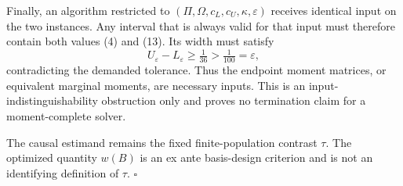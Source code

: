 Finally, an algorithm restricted to \((\Pi,\Omega,c_L,c_U,\kappa,\varepsilon)\) receives identical input on the two instances.  Any interval that is always valid for that input must therefore contain both values (4) and (13).  Its width must satisfy
\[
U_\varepsilon-L_\varepsilon\ge\tfrac1{36}>\tfrac1{100}=\varepsilon,
\]
contradicting the demanded tolerance.  Thus the endpoint moment matrices, or equivalent marginal moments, are necessary inputs.  This is an input-indistinguishability obstruction only and proves no termination claim for a moment-complete solver.

The causal estimand remains the fixed finite-population contrast \(\tau\).  The optimized quantity \(w(B)\) is an ex ante basis-design criterion and is not an identifying definition of \(\tau\).  \(\square\)